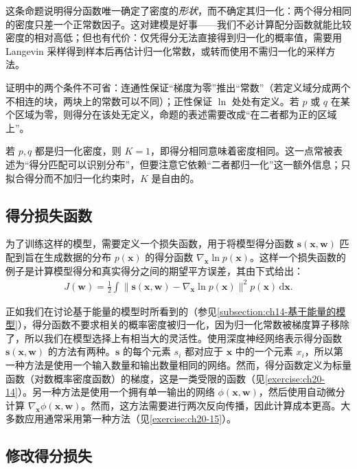 \documentclass[../../main.tex]{subfiles}
\begin{document}
\begin{remark}
这条命题说明得分函数唯一确定了密度的\emph{形状}，而不确定其归一化：两个得分相同的密度只差一个正常数因子。这对建模是好事——我们不必计算配分函数就能比较密度的相对高低；但也有代价：仅凭得分无法直接得到归一化的概率值，需要用 Langevin 采样得到样本后再估计归一化常数，或转而使用不需归一化的采样方法。\par
证明中的两个条件不可省：连通性保证“梯度为零”推出“常数”（若定义域分成两个不相连的块，两块上的常数可以不同）；正性保证 $\ln$ 处处有定义。若 $p$ 或 $q$ 在某个区域为零，则得分在该处无定义，命题的表述需要改成“在二者都为正的区域上”。\par
若 $p,q$ 都是归一化密度，则 $K=1$，即得分相同意味着密度相同。这一点常被表述为“得分匹配可以识别分布”，但要注意它依赖“二者都归一化”这一额外信息；只拟合得分而不加归一化约束时，$K$ 是自由的。
\end{remark}

\subsection{得分损失函数}\label{subsection:ch20-得分损失}

为了训练这样的模型，需要定义一个损失函数，用于将模型得分函数 $\bm{s}(\bm{x},\bm{w})$ 匹配到旨在生成数据的分布 $p(\bm{x})$ 的得分函数 $\nabla_{\bm{x}}\ln p(\bm{x})$。这样一个损失函数的例子是计算模型得分和真实得分之间的期望平方误差，其由下式给出：
\begin{align}
J(\bm{w})=\frac{1}{2}\int\big\|\bm{s}(\bm{x},\bm{w})-\nabla_{\bm{x}}\ln p(\bm{x})\big\|^2p(\bm{x})\,\mathrm{d}\bm{x}.
\label{align:ch20-得分损失}
\end{align}

正如我们在讨论基于能量的模型时所看到的（参见\cref{subsection:ch14-基于能量的模型}），得分函数不要求相关的概率密度被归一化，因为归一化常数被梯度算子移除了，所以我们在模型选择上有相当大的灵活性。使用深度神经网络表示得分函数 $\bm{s}(\bm{x},\bm{w})$ 的方法有两种。$\bm{s}$ 的每个元素 $s_i$ 都对应于 $\bm{x}$ 中的一个元素 $x_i$，所以第一种方法是使用一个输入数量和输出数量相同的网络。然而，得分函数定义为标量函数（对数概率密度函数）的梯度，这是一类受限的函数（见\cref{exercise:ch20-14}）。另一种方法是使用一个拥有单一输出的网络 $\phi(\bm{x},\bm{w})$，然后使用自动微分计算 $\nabla_{\bm{x}}\phi(\bm{x},\bm{w})$。然而，这方法需要进行两次反向传播，因此计算成本更高。大多数应用通常采用第一种方法（见\cref{exercise:ch20-15}）。

\subsection{修改得分损失}\label{subsection:ch20-修改得分损失}
\end{document}
